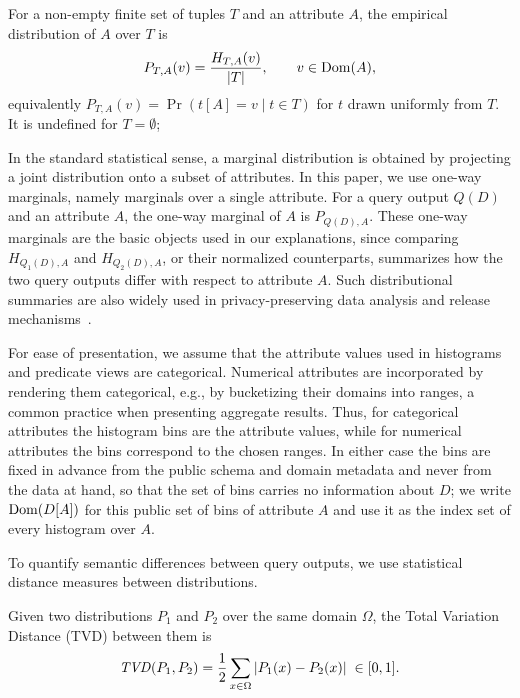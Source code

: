 \begin{definition}
\label{def:empirical-distribution}
For a non-empty finite set of tuples $T$ and an attribute $A$, the empirical
distribution of $A$ over $T$ is
\[
P_{T,A}(v) = \frac{H_{T,A}(v)}{|T|},
\qquad v\in\operatorname{Dom}(A),
\]
equivalently $P_{T,A}(v)=\Pr\left(t[A]=v \mid t\in T\right)$ for $t$ drawn uniformly
from $T$. It is undefined for $T=\emptyset$;
\end{definition}

In the standard statistical sense, a marginal distribution is obtained by
projecting a joint distribution onto a subset of attributes. In this
paper, we use one-way marginals, namely marginals over a single
attribute.
For a query output $Q(D)$ and an attribute $A$, the one-way marginal of
$A$ is $P_{Q(D),A}$.
These one-way marginals are the basic objects used in our explanations, since
comparing $H_{Q_1(D),A}$ and $H_{Q_2(D),A}$, or their normalized counterparts,
summarizes how the two query outputs differ with respect to attribute $A$.
Such distributional summaries are also widely used in privacy-preserving data
analysis and release mechanisms~\cite{TheAlgFoundDP2014}.

For ease of presentation, we assume that the attribute values used in
histograms and predicate views are categorical. Numerical attributes are
incorporated by rendering them categorical, e.g., by bucketizing their
domains into ranges, a common practice when presenting aggregate
results. Thus, for categorical attributes the histogram bins are the
attribute values, while for numerical attributes the bins correspond to
the chosen ranges.
In either case the bins are fixed in advance from the public schema and domain
metadata and never from the data at hand, so that the set of bins carries no
information about $D$; we write $\operatorname{Dom}(D[A])$ for this public set of bins of
attribute $A$ and use it as the index set of every histogram over $A$.



To quantify semantic differences between query outputs, we use statistical distance
measures between distributions.

\begin{definition}
\label{def:tvd}
Given two distributions $P_1$ and $P_2$ over the same domain $\Omega$, the Total
Variation Distance (TVD) between them is
\[
\mathit{TVD}(P_1,P_2)
=
\frac{1}{2}
\sum_{x\in\Omega}
|P_1(x)-P_2(x)| \; \in [0,1].
\]
\end{definition}

